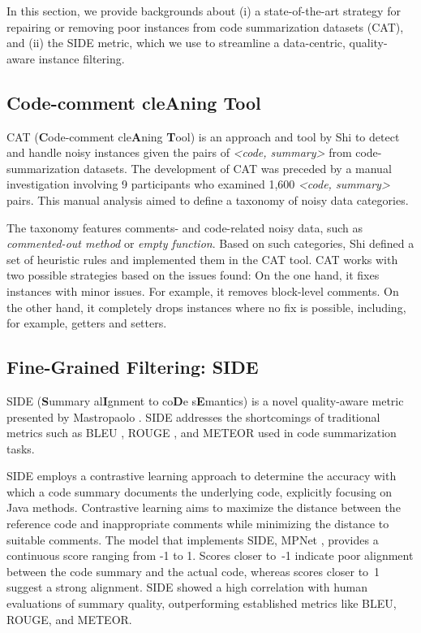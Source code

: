 In this section, we provide backgrounds about (i) a state-of-the-art strategy for repairing or removing poor instances from code summarization datasets (CAT), and (ii) the SIDE metric, which we use to streamline a data-centric, quality-aware instance filtering.

\subsection{Code-comment cleAning Tool}
CAT (\textbf{C}ode-comment cle\textbf{A}ning \textbf{T}ool) is an approach and tool by Shi \etal \cite{shi2022we} to detect and handle noisy instances given the pairs of \textit{<code, summary>} from code-summarization datasets. The development of CAT was preceded by a manual investigation involving 9 participants who examined 1,600 \textit{<code, summary>} pairs. This manual analysis aimed to define a taxonomy of noisy data categories.

The taxonomy features comments- and code-related noisy data, such as \textit{commented-out method} or \textit{empty function}. Based on such categories, Shi \etal defined a set of heuristic rules and implemented them in the CAT tool. CAT works with two possible strategies based on the issues found: On the one hand, it fixes instances with minor issues. For example, it removes block-level comments. On the other hand, it completely drops instances where no fix is possible, including, for example, getters and setters.

\subsection{Fine-Grained Filtering: SIDE}
\label{sec:side-aware}
SIDE (\textbf{S}ummary al\textbf{I}gnment to co\textbf{D}e s\textbf{E}mantics) is a novel quality-aware metric presented by Mastropaolo \etal \cite{mastropaolo2024evaluating}. SIDE addresses the shortcomings of traditional metrics such as BLEU \cite{papineni2002bleu}, ROUGE \cite{lin:tsbo2004}, and METEOR \cite{banerjee:acl2005} used in code summarization tasks. 

SIDE employs a contrastive learning approach to determine the accuracy with which a code summary documents the underlying code, explicitly focusing on Java methods. Contrastive learning aims to maximize the distance between the reference code and inappropriate comments while minimizing the distance to suitable comments. The model that implements SIDE, MPNet \cite{Song2020MPNetMA}, provides a continuous score ranging from -1 to 1. Scores closer to~-1 indicate poor alignment between the code summary and the actual code, whereas scores closer to~1 suggest a strong alignment. SIDE showed a high correlation with human evaluations of summary quality, outperforming established metrics like BLEU, ROUGE, and METEOR. 


